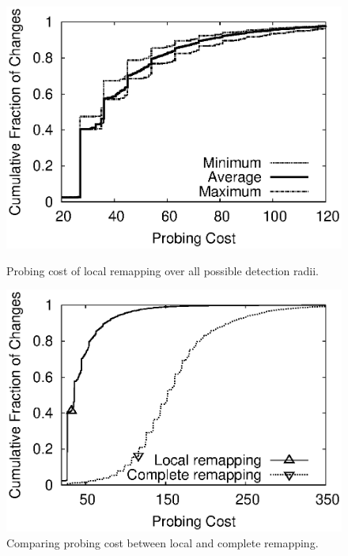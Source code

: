 \begin{figure}
\begin{minipage}{0.33\textwidth}
\includegraphics[width=1.05\textwidth]{figs/rmprtcost.eps}
\caption{Probing cost of local remapping over all possible
detection radii.}
\label{fig:sim.rmprt.start}
\end{minipage}
\hfill
\begin{minipage}{0.33\textwidth}
\includegraphics[width=1.05\textwidth]{figs/costprobe.eps}
\caption{Comparing probing cost between local and complete remapping.}
\label{fig:sim.abs.cmp}
\end{minipage}
\hfill
\begin{minipage}{0.33\textwidth}

\end{minipage}
\end{figure}
